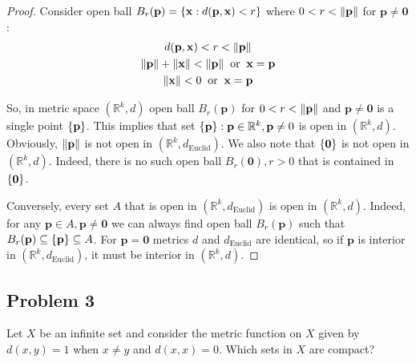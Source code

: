 \documentclass{article}
\newcommand{\R}{\mathbb{R}}
\newcommand{\vect}[1]{\mathbf{#1}}
\DeclarePairedDelimiter{\norm}{\lVert}{\rVert}
\DeclarePairedDelimiter{\set}{ \{ }{ \} }
\begin{document}
\begin{proof}

Consider open ball $B_r(\vect{p}) = \set{ \vect{x} : d(\vect{p}, \vect{x}) < r }$ where $0 < r < \norm{ \vect{p} }$ for $\vect{p} \neq \vect{0}$:
\begin{gather*}
    d(\vect{p}, \vect{x}) < r < \norm{ \vect{p} } \\
    \norm{ \vect{p} } + \norm{ \vect{x} } < \norm{ \vect{p} } \> \text{ or } \> \vect{x} = \vect{p} \\
    \norm{ \vect{x} } < 0 \> \text{ or } \> \vect{x} = \vect{p}
\end{gather*}

So, in metric space $(\R^k, d)$ open ball $B_r(\vect{p})$ for $0 < r < \norm{ \vect{p} }$ and $\vect{p} \neq \vect{0}$ is a single point $\set{ \vect{p} }$.
This implies that set $\set{ \vect{p} } : \vect{p} \in \R^k, \vect{p} \neq 0$ is open in $(\R^k, d)$.
Obviously, $\norm{ \vect{p} }$ is not open in $(\R^k, d_\text{Euclid})$. We also note that $\set{ \vect{0} }$ is not open in $(\R^k, d)$.
Indeed, there is no such open ball $B_r(\vect{0}), r>0$ that is contained in $\set{ \vect{0} }$.

Conversely, every set $A$ that is open in $(\R^k, d_\text{Euclid})$ is open in $(\R^k, d)$.
Indeed, for any $\vect{p} \in A, \vect{p} \neq \vect{0}$ we can always find open ball $B_r(\vect{p})$ such that $B_r(\vect{p}) \subseteq \set{ \vect{p} } \subseteq A$.
For $\vect{p} = \vect{0}$ metrics $d$ and $d_\text{Euclid}$ are identical, so if $\vect{p}$ is interior in $(\R^k, d_\text{Euclid})$, it must be interior in $(\R^k, d)$.
\end{proof}


\subsection*{Problem 3}

\begin{tcolorbox}
Let $X$ be an infinite set and consider the metric function on $X$ given by $d(x, y) = 1$ when $x \neq y$ and $d(x, x) = 0$.
Which sets in $X$ are compact?
\end{tcolorbox}
\end{document}
